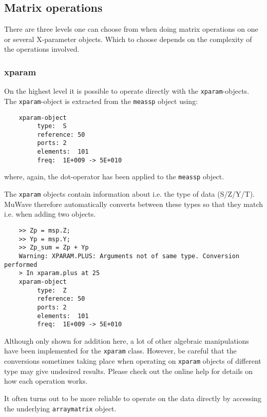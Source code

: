 \subsection{Matrix operations}
There are three levels one can choose from when doing matrix
operations on one or several X-parameter objects. Which to choose
depends on the complexity of the operations involved.

\subsubsection{xparam}
On the highest level it is possible to operate directly with the
\verb"xparam"-objects. The \verb"xparam"-object is extracted from
the \verb"meassp" object using:
\begin{small}
\begin{verbatim}
    xparam-object
    	 type:	S
    	 reference:	50
    	 ports:	2
    	 elements:	101
    	 freq:	1E+009 -> 5E+010
\end{verbatim}
\end{small}
where, again, the dot-operator has been applied to the
\verb"meassp" object.

The \verb"xparam" objects contain information about i.e. the type
of data (S/Z/Y/T). MuWave therefore automatically converts between
these types so that they match i.e. when adding two objects.
\begin{small}
\begin{verbatim}
    >> Zp = msp.Z;
    >> Yp = msp.Y;
    >> Zp_sum = Zp + Yp
    Warning: XPARAM.PLUS: Arguments not of same type. Conversion performed
    > In xparam.plus at 25
    xparam-object
    	 type:	Z
    	 reference:	50
    	 ports:	2
    	 elements:	101
    	 freq:	1E+009 -> 5E+010
\end{verbatim}
\end{small}
Although only shown for addition here, a lot of other algebraic
manipulations have been implemented for the \verb"xparam" class.
However, be careful that the conversions sometimes taking place
when operating on \verb"xparam" objects of different type may give
undesired results. Please check out the online help for details on
how each operation works.

It often turns out to be more reliable to operate on the data
directly by accessing the underlying \verb"arraymatrix" object.

